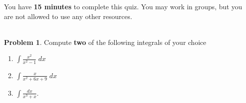 \documentclass[12pt]{article}
\theoremstyle{plain}
\theoremstyle{definition}
\newtheorem{problem}[exercise]{Problem}
\theoremstyle{remark}
\begin{document}
\author{TA: \href{mailto:\authoremail}{\documentauthor}}
\title{\documenttitle}
\date{\today}
\maketitle

You have \textbf{15 minutes} to complete this quiz. You may work in groups,
but you are not allowed to use any other resources.
\\\\
\begin{problem}
Compute \textbf{two} of the following integrals of your choice
\begin{enumerate}[label=(\alph*)]
\item $\displaystyle\int\frac{x^2}{x^2-1}\;dx$
\item $\displaystyle\int\frac{x}{x^2+6x+9}\;dx$
\item $\displaystyle\int\frac{dx}{x^3+x}.$
\end{enumerate}
\end{problem}
\newpage
\end{document}
